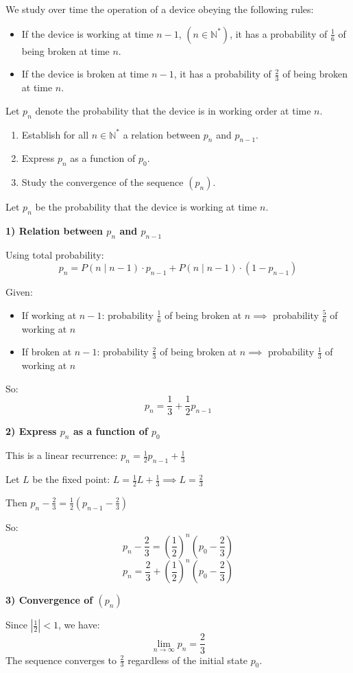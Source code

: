 \documentclass[12pt]{article}
\begin{document}
\section{}
We study over time the operation of a device obeying the following rules:

\begin{itemize}
    \item If the device is working at time $n-1$, $(n \in \mathbb{N}^*)$, it has a probability of $\frac{1}{6}$ of being broken at time $n$.
    \item If the device is broken at time $n-1$, it has a probability of $\frac{2}{3}$ of being broken at time $n$.
\end{itemize}

Let $p_n$ denote the probability that the device is in working order at time $n$.

\begin{enumerate}
    \item Establish for all $n \in \mathbb{N}^*$ a relation between $p_n$ and $p_{n-1}$.
    \item Express $p_n$ as a function of $p_0$.
    \item Study the convergence of the sequence $(p_n)$.
\end{enumerate}

\begin{correctionbox}
Let $p_n$ be the probability that the device is working at time $n$.

\textbf{1) Relation between $p_n$ and $p_{n-1}$}

Using total probability:
\[
p_n = P(n \mid n-1) \cdot p_{n-1} + P(n \mid n-1) \cdot (1 - p_{n-1})
\]

Given:
\begin{itemize}
    \item If working at $n-1$: probability $\frac{1}{6}$ of being broken at $n \implies$ probability $\frac{5}{6}$ of working at $n$
    \item If broken at $n-1$: probability $\frac{2}{3}$ of being broken at $n \implies$ probability $\frac{1}{3}$ of working at $n$
\end{itemize}
So:
\[
p_n = \frac{1}{3} + \frac{1}{2}p_{n-1}
\]

\textbf{2) Express $p_n$ as a function of $p_0$}

This is a linear recurrence: $p_n = \frac{1}{2}p_{n-1} + \frac{1}{3}$

Let $L$ be the fixed point: $L = \frac{1}{2}L + \frac{1}{3} \implies L = \frac{2}{3}$

Then $p_n - \frac{2}{3} = \frac{1}{2}(p_{n-1} - \frac{2}{3})$

So:
\[
p_n - \frac{2}{3} = \left(\frac{1}{2}\right)^n (p_0 - \frac{2}{3})
\]
\[
p_n = \frac{2}{3} + \left(\frac{1}{2}\right)^n (p_0 - \frac{2}{3})
\]

\textbf{3) Convergence of $(p_n)$}

Since $\left|\frac{1}{2}\right| < 1$, we have:
\[
\lim_{n \to \infty} p_n = \frac{2}{3}
\]
The sequence converges to $\frac{2}{3}$ regardless of the initial state $p_0$.
\end{correctionbox}
\end{document}
